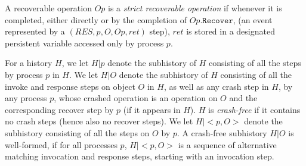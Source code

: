 \begin{definition}
\label{def:strict-recoverable-op}
A recoverable operation $Op$ is a \textit{strict recoverable operation} if whenever it is completed, either directly or by the completion of $Op.\texttt{Recover}$, (an event represented by a $(RES,p,O,Op,ret)$ step), $ret$ is stored in a designated persistent variable accessed only by process $p$.
\end{definition}


For a history $H$, we let $H | p$ denote the subhistory of $H$ consisting of all the steps by process $p$ in $H$. We let $H | O$ denote the subhistory of $H$ consisting of all the invoke and response steps on object $O$ in $H$, as well as any crash step in $H$, by any process $p$, whose crashed operation is an operation on $O$ and the corresponding recover step by $p$ (if it appears in $H$). $H$ is \emph{crash-free} if it contains no crash steps (hence also no recover steps). We let $H|{<}p,O{>}$ denote the subhistory consisting of all the steps on $O$ by $p$. %
A crash-free subhistory $H | O$ is well-formed, if for all processes $p$, $H|{<}p,O{>}$ is a sequence of alternative matching invocation and response steps, starting with an invocation step.



